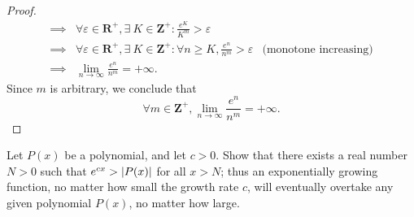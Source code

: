 \begin{proof}
\begin{align*}
        \implies & \forall \varepsilon \in \mathbf{R}^+, \exists\ K \in \mathbf{Z}^+ : \frac{e^K}{K^m} > \varepsilon                                                                          \\
        \implies & \forall \varepsilon \in \mathbf{R}^+, \exists\ K \in \mathbf{Z}^+ : \forall n \geq K, \frac{e^n}{n^m} > \varepsilon                         & \text{(monotone increasing)} \\
        \implies & \lim_{n \to \infty} \frac{e^n}{n^m} = +\infty.
    \end{align*}
    Since \(m\) is arbitrary, we conclude that
    \[
        \forall m \in \mathbf{Z}^+, \lim_{n \to \infty} \frac{e^n}{n^m} = +\infty.
    \]
\end{proof}

\begin{exercise}\label{ex 4.5.9}
    Let \(P(x)\) be a polynomial, and let \(c > 0\).
    Show that there exists a real number \(N > 0\) such that \(e^{cx} > \abs*{P(x)}\) for all \(x > N\);
    thus an exponentially growing function, no matter how small the growth rate \(c\), will eventually overtake any given polynomial \(P(x)\), no matter how large.
\end{exercise}

